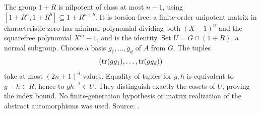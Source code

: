 The group \(1+R\) is nilpotent of class at most \(n-1\),
using \([1+R^a,1+R^b]\subseteq1+R^{a+b}\).
It is torsion-free: a finite-order unipotent matrix
in characteristic zero has minimal polynomial
dividing both \((X-1)^n\) and the squarefree
polynomial \(X^m-1\), and is the identity.
Set \(U=G\cap(1+R)\), a normal subgroup.
Choose a basis \(g_1,\ldots,g_d\) of \(A\) from \(G\).
The tuples
\[
 (\operatorname{tr}(gg_1),\ldots,\operatorname{tr}(gg_d))
\]
take at most \((2n+1)^d\) values. Equality of tuples
for \(g,h\) is equivalent to \(g-h\in R\), hence
to \(gh^{-1}\in U\). They distinguish exactly the
cosets of \(U\), proving the index bound.
No finite-generation hypothesis or matrix realization
of the abstract automorphisms was used. Source:
.

